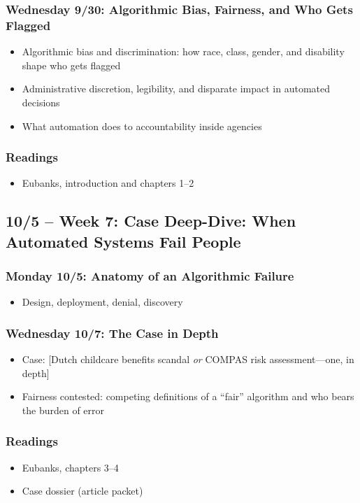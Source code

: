 \documentclass[12pt]{article}
\begin{document}
    \subsubsection*{Wednesday 9/30: Algorithmic Bias, Fairness, and Who Gets Flagged}
        \begin{itemize}
            \item Algorithmic bias and discrimination: how race, class, gender, and disability shape who gets flagged
            \item Administrative discretion, legibility, and disparate impact in automated decisions
            \item What automation does to accountability inside agencies
        \end{itemize}
    \subsubsection*{Readings}
        \begin{itemize}
            \item Eubanks, introduction and chapters 1--2
        \end{itemize}

\subsection*{10/5 -- Week 7: Case Deep-Dive: When Automated Systems Fail People}
    \subsubsection*{Monday 10/5: Anatomy of an Algorithmic Failure}
        \begin{itemize}
            \item Design, deployment, denial, discovery
        \end{itemize}
    \subsubsection*{Wednesday 10/7: The Case in Depth}
        \begin{itemize}
            \item Case: [Dutch childcare benefits scandal \emph{or} COMPAS risk assessment---one, in depth]
            \item Fairness contested: competing definitions of a ``fair'' algorithm and who bears the burden of error
        \end{itemize}
    \subsubsection*{Readings}
        \begin{itemize}
            \item Eubanks, chapters 3--4
            \item Case dossier (article packet)
        \end{itemize}
\end{document}
